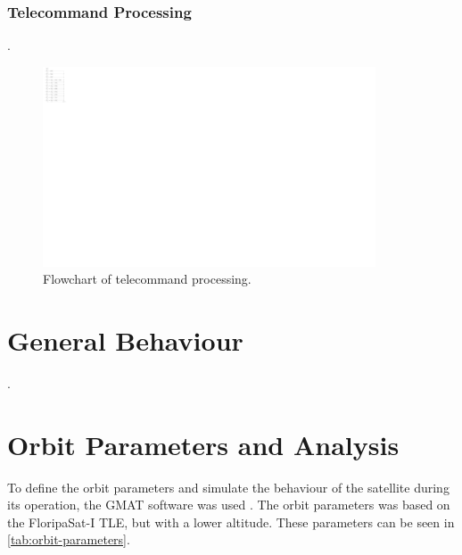 \subsubsection{Telecommand Processing}

.

\begin{figure}[!ht]
    \begin{center}
        \includegraphics[width=0.88\textwidth]{figures/tc-flowchart.pdf}
        \caption{Flowchart of telecommand processing.}
        \label{fig:tc-flowchart}
    \end{center}
\end{figure}

\section{General Behaviour}

.

\section{Orbit Parameters and Analysis}

To define the orbit parameters and simulate the behaviour of the satellite during its operation, the GMAT software was used \cite{gmat}. The orbit parameters was based on the FloripaSat-I TLE, but with a lower altitude. These parameters can be seen in \autoref{tab:orbit-parameters}.


